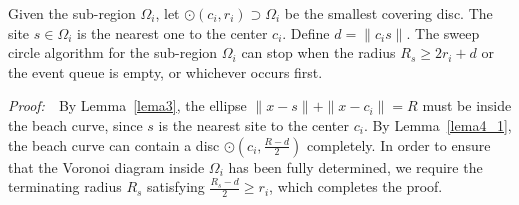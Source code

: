 {{\vspace{0.1in}\begin{theorem}\label{thm_r} Given the sub-region
$\Omega_i$, let $\odot(c_i,r_i)\supset\Omega_i$ be the smallest
covering disc. The site $s\in\Omega_i$ is the nearest one to the
center $c_i$. Define $d=\|c_is\|$. The sweep circle algorithm for
the sub-region $\Omega_i$ can stop when the radius $R_s\geq 2r_i+d$
or the event queue is empty, or whichever occurs first.\end{theorem}
\vspace{0.1in}\noindent\textit{Proof:}~~By Lemma~\ref{lema3}, the
ellipse $\|x-s\|+\|x-c_i\|=R$ must be inside the beach curve, since
$s$ is the nearest site to the center $c_i$. By Lemma~\ref{lema4_1},
the beach curve can contain a disc $\odot(c_i,\frac{R-d}{2})$
completely. In order to ensure that the Voronoi diagram inside
$\Omega_i$ has been fully determined, we require the terminating
radius $R_s$ satisfying $\frac{R_s-d}{2}\geq r_i$, which completes
the proof. %
\begin{figure}[!htbp]
\vspace{-2mm}
\begin{center}

\end{center}
\end{figure}}}
